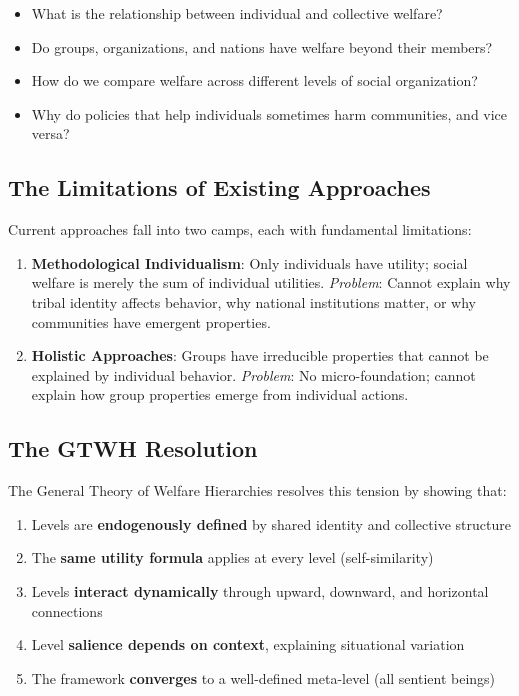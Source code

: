 \documentclass[12pt,a4paper]{article}
\begin{document}
\begin{itemize}[nosep]
\item What is the relationship between individual and collective welfare?
\item Do groups, organizations, and nations have welfare beyond their members?
\item How do we compare welfare across different levels of social organization?
\item Why do policies that help individuals sometimes harm communities, and vice versa?
\end{itemize}

\subsection{The Limitations of Existing Approaches}

Current approaches fall into two camps, each with fundamental limitations:

\begin{enumerate}[nosep]
\item \textbf{Methodological Individualism}: Only individuals have utility; 
social welfare is merely the sum of individual utilities. 
\textit{Problem}: Cannot explain why tribal identity affects behavior, 
why national institutions matter, or why communities have emergent properties.

\item \textbf{Holistic Approaches}: Groups have irreducible properties that 
cannot be explained by individual behavior.
\textit{Problem}: No micro-foundation; cannot explain how group properties 
emerge from individual actions.
\end{enumerate}

\subsection{The GTWH Resolution}

The General Theory of Welfare Hierarchies resolves this tension by showing that:
\begin{enumerate}[nosep]
\item Levels are \textbf{endogenously defined} by shared identity and collective structure
\item The \textbf{same utility formula} applies at every level (self-similarity)
\item Levels \textbf{interact dynamically} through upward, downward, and horizontal connections
\item Level \textbf{salience depends on context}, explaining situational variation
\item The framework \textbf{converges} to a well-defined meta-level (all sentient beings)
\end{enumerate}
\end{document}

